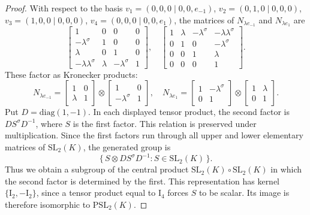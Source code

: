 \documentclass{amsart}
\def\II{\mathord{\mathrm{I}}}
\newcommand{\diag}{\mathrm{diag}}
\newcommand{\PSL}{\mathrm{PSL}}
\newcommand{\SL}{\mathrm{SL}}
\newcommand{\s}{\sigma}
\theoremstyle{plain}
\numberwithin{theorem}{section}
\theoremstyle{definition}
\begin{document}
\begin{proof}
	With respect to the basis $v_1 = (0,0,0\mid 0,0,e_{-1})$, $v_2 = (0,1,0\mid 0,0,0)$,
	$v_3 = (1,0,0\mid 0,0,0)$, $v_4 = (0,0,0\mid 0,0,e_1)$, the matrices of
	$N_{\lambda e_{-1}}$ and $N_{\lambda e_1}$ are
	\begin{equation*}
		\begin{bmatrix}
			1 & 0 & 0 & 0 \\
			-\lambda^{\s} & 1 & 0 & 0 \\
			\lambda & 0 & 1 & 0 \\
			-\lambda\lambda^{\s} & \lambda & -\lambda^{\s} & 1
		\end{bmatrix},\quad
		\begin{bmatrix}
			1 & \lambda & -\lambda^{\s} & -\lambda\lambda^{\s} \\
			0 & 1 & 0 & -\lambda^{\s} \\
			0 & 0 & 1 & \lambda \\
			0 & 0 & 0 & 1
		\end{bmatrix}.
	\end{equation*}
	These factor as Kronecker products:
	\begin{equation*}
		N_{\lambda e_{-1}} =
		\begin{bmatrix} 1 & 0 \\ \lambda & 1 \end{bmatrix} \otimes
		\begin{bmatrix} 1 & 0 \\ -\lambda^{\s} & 1 \end{bmatrix},\quad
		N_{\lambda e_1} =
		\begin{bmatrix} 1 & -\lambda^{\s} \\ 0 & 1 \end{bmatrix} \otimes
		\begin{bmatrix} 1 & \lambda \\ 0 & 1 \end{bmatrix}.
	\end{equation*}
	Put $D=\diag(1,-1)$. In each displayed tensor product, the second
	factor is $DS^{\s}D^{-1}$, where $S$ is the first factor. This relation
	is preserved under multiplication. Since the first factors run through
	all upper and lower elementary matrices of $\SL_2(K)$, the generated
	group is
	\begin{equation*}
		\{\,S\otimes DS^{\s}D^{-1}:S\in\SL_2(K)\,\}.
	\end{equation*}
	Thus we obtain a subgroup of the central product
	$\SL_2(K)\circ\SL_2(K)$ in which the second factor is determined by
	the first. This representation has kernel $\{\II_2,-\II_2\}$, since
	a tensor product equal to $\II_4$ forces $S$ to be scalar. Its image
	is therefore isomorphic to $\PSL_2(K)$.


\end{proof}
\end{document}
